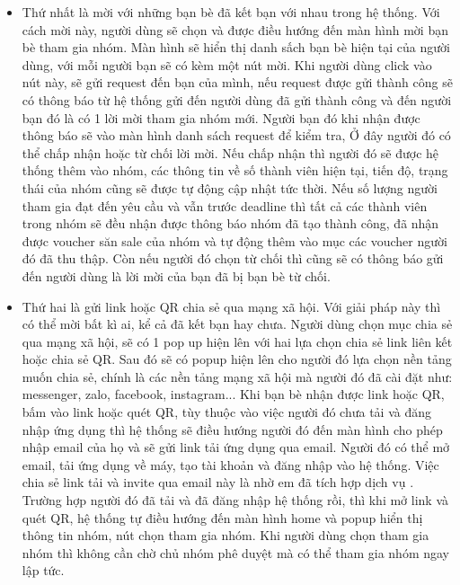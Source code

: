\documentclass[../DoAn.tex]{subfiles}
\begin{document}
\begin{itemize}
    \item Thứ nhất là mời với những bạn bè đã kết bạn với nhau trong hệ thống. Với cách mời này, người dùng sẽ chọn và được điều hướng đến màn hình mời bạn bè tham gia nhóm. Màn hình sẽ hiển thị danh sấch bạn bè hiện tại của người dùng, với mỗi người bạn sẽ có kèm một nút mời. Khi người dùng click vào nút này, sẽ gửi request đến bạn của mình, nếu request được gửi thành công sẽ có thông báo từ hệ thống gửi đến người dùng đã gửi thành công và đến người bạn đó là có 1 lời mời tham gia nhóm mới. Người bạn đó khi nhận được thông báo sẽ vào màn hình danh sách request để kiểm tra, Ở đây người đó có thể chấp nhận hoặc từ chối lời mời. Nếu chấp nhận thì người đó sẽ được hệ thống thêm vào nhóm, các thông tin về số thành viên hiện tại, tiến độ, trạng thái của nhóm cũng sẽ được tự động cập nhật tức thời. Nếu số lượng người tham gia đạt đến yêu cầu và vẫn trước deadline thì tất cả các thành viên trong nhóm sẽ đều nhận được thông báo nhóm đã tạo thành công, đã nhận được voucher săn sale của nhóm và tự động thêm vào mục các voucher người đó đã thu thập. Còn nếu người đó chọn từ chối thì cũng sẽ có thông báo gửi đến người dùng là lời mời của bạn đã bị bạn bè từ chối.
    \item Thứ hai là gửi link hoặc QR chia sẻ qua mạng xã hội. Với giải pháp này thì có thể mời bất kì ai, kể cả đã kết bạn hay chưa. Người dùng chọn mục chia sẻ qua mạng xã hội, sẽ có 1 pop up hiện lên với hai lựa chọn chia sẻ link liên kết hoặc chia sẻ QR. Sau đó sẽ có popup hiện lên cho người đó lựa chọn nền tảng muốn chia sẻ, chính là các nền tảng mạng xã hội mà người đó đã cài đặt như: messenger, zalo, facebook, instagram... Khi bạn bè nhận được link hoặc QR, bấm vào link hoặc quét QR, tùy thuộc vào việc người đó chưa tải và đăng nhập ứng dụng thì hệ thống sẽ điều hướng người đó đến màn hình cho phép nhập email của họ và sẽ gửi link tải ứng dụng qua email. Người đó có thể mở email, tải ứng dụng về máy, tạo tài khoản và đăng nhập vào hệ thống. Việc chia sẻ link tải và invite qua email này là nhờ em đã tích hợp dịch vụ \cite{FirebaseAppDistribution}. Trường hợp người đó đã tải và đã đăng nhập hệ thống rồi, thì khi mở link và quét QR, hệ thống tự điều hướng đến màn hình home và popup hiển thị thông tin nhóm, nút chọn tham gia nhóm. Khi người dùng chọn tham gia nhóm thì không cần chờ chủ nhóm phê duyệt mà có thể tham gia nhóm ngay lập tức.    
\end{itemize}
\end{document}
